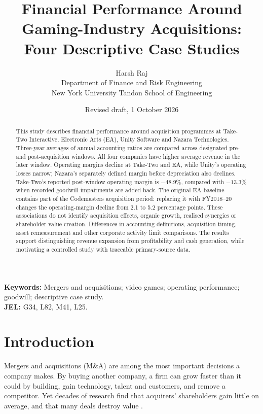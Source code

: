 \documentclass[11pt]{article}
\begin{document}
\title{Financial Performance Around Gaming-Industry Acquisitions: Four Descriptive Case Studies}

\author{Harsh Raj\\Department of Finance and Risk Engineering\\New York University Tandon School of Engineering}
\date{Revised draft, 1 October 2026}

\maketitle
\begin{abstract}
This study describes financial performance around acquisition programmes at Take-Two Interactive, Electronic Arts (EA), Unity Software and Nazara Technologies. Three-year averages of annual accounting ratios are compared across designated pre- and post-acquisition windows. All four companies have higher average revenue in the later window. Operating margins decline at Take-Two and EA, while Unity's operating losses narrow; Nazara's separately defined margin before depreciation also declines. Take-Two's reported post-window operating margin is $-48.9\%$, compared with $-13.3\%$ when recorded goodwill impairments are added back. The original EA baseline contains part of the Codemasters acquisition period: replacing it with FY2018--20 changes the operating-margin decline from 2.1 to 5.2 percentage points. These associations do not identify acquisition effects, organic growth, realised synergies or shareholder value creation. Differences in accounting definitions, acquisition timing, asset remeasurement and other corporate activity limit comparisons. The results support distinguishing revenue expansion from profitability and cash generation, while motivating a controlled study with traceable primary-source data.
\end{abstract}
\noindent\textbf{Keywords:} Mergers and acquisitions; video games; operating performance; goodwill; descriptive case study.\\
\textbf{JEL:} G34, L82, M41, L25.

\section{Introduction}\label{sec:intro}

Mergers and acquisitions (M\&A) are among the most important decisions a company makes. By buying another company, a firm can grow faster than it could by building, gain technology, talent and customers, and remove a competitor. Yet decades of research find that acquirers' shareholders gain little on average, and that many deals destroy value \citep{andrade2001,moeller2005}.
\end{document}
